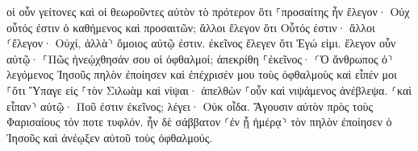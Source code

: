 \documentclass{openreader}
\begin{document}
οἱ οὖν γείτονες καὶ οἱ θεωροῦντες αὐτὸν τὸ πρότερον ὅτι ⸀προσαίτης ἦν ἔλεγον· Οὐχ οὗτός ἐστιν ὁ καθήμενος καὶ προσαιτῶν; 
ἄλλοι ἔλεγον ὅτι Οὗτός ἐστιν· ἄλλοι ⸂ἔλεγον· Οὐχί, ἀλλὰ⸃ ὅμοιος αὐτῷ ἐστιν. ἐκεῖνος ἔλεγεν ὅτι Ἐγώ εἰμι. 
ἔλεγον οὖν αὐτῷ· ⸀Πῶς ἠνεῴχθησάν σου οἱ ὀφθαλμοί; 
ἀπεκρίθη ⸀ἐκεῖνος· ⸂Ὁ ἄνθρωπος ὁ⸃ λεγόμενος Ἰησοῦς πηλὸν ἐποίησεν καὶ ἐπέχρισέν μου τοὺς ὀφθαλμοὺς καὶ εἶπέν μοι ⸀ὅτι Ὕπαγε εἰς ⸀τὸν Σιλωὰμ καὶ νίψαι· ἀπελθὼν ⸀οὖν καὶ νιψάμενος ἀνέβλεψα. 
⸂καὶ εἶπαν⸃ αὐτῷ· Ποῦ ἐστιν ἐκεῖνος; λέγει· Οὐκ οἶδα. 
Ἄγουσιν αὐτὸν πρὸς τοὺς Φαρισαίους τόν ποτε τυφλόν. 
ἦν δὲ σάββατον ⸂ἐν ᾗ ἡμέρᾳ⸃ τὸν πηλὸν ἐποίησεν ὁ Ἰησοῦς καὶ ἀνέῳξεν αὐτοῦ τοὺς ὀφθαλμούς. 
\end{document}

